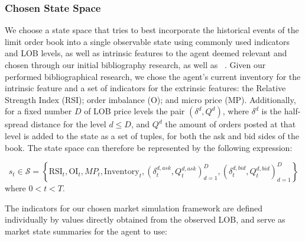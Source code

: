 \subsubsection{Chosen State Space}
We choose a state space that tries to best incorporate the historical events of the limit order book into a single observable state using commonly used indicators and LOB levels,
as well as intrinsic features to the agent deemed relevant and chosen through our initial bibliography research, as well as ~\cite{Gasperov2021}.
Given our performed bibliographical research, we chose the agent's current inventory for the intrinsic feature and a set of indicators for the extrinsic features:
the Relative Strength Index (RSI); order imbalance (O); and micro price (MP).
Additionally, for a fixed number $D$ of LOB price levels the pair $(\delta^d, Q^d)$, where $\delta^d$ is the half-spread distance for the level $d \leq D$,
and $Q^d$ the amount of orders posted at that level is added to the state as a set of tuples, for both the ask and bid sides of the book.
The state space can therefore be represented by the following expression:

\[
    s_{t} \in \mathcal{S} = \left\{ \text{RSI}_t, \text{OI}_t, MP_{t}, \text{Inventory}_t, \left( \delta_t^{d, ask}, Q_t^{d, ask} \right)_{d=1}^{D}, \left( \delta_t^{d, bid}, Q_t^{d, bid} \right)_{d=1}^{D} \right\}
\]
where $0 < t < T$.

The indicators for our chosen market simulation framework are defined individually by values directly obtained from the observed LOB,
and serve as market state summaries for the agent to use:

